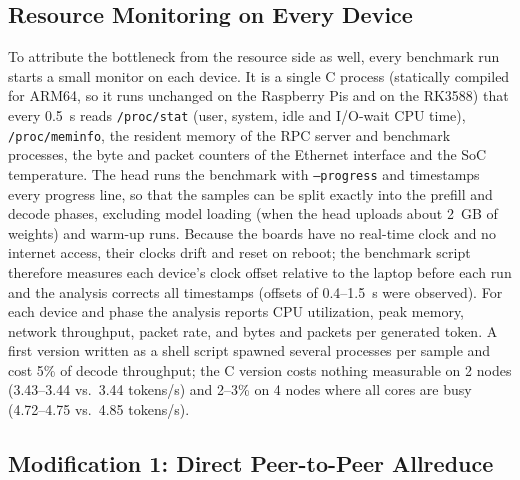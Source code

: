 \documentclass[11pt,a4paper]{article}
\begin{document}
\subsection{Resource Monitoring on Every Device}\label{sec:monitor}

To attribute the bottleneck from the resource side as well, every benchmark run starts a small monitor on each device. It is a single C process (statically compiled for ARM64, so it runs unchanged on the Raspberry Pis and on the RK3588) that every 0.5~s reads \texttt{/proc/stat} (user, system, idle and I/O-wait CPU time), \texttt{/proc/meminfo}, the resident memory of the RPC server and benchmark processes, the byte and packet counters of the Ethernet interface and the SoC temperature. The head runs the benchmark with \texttt{--progress} and timestamps every progress line, so that the samples can be split exactly into the prefill and decode phases, excluding model loading (when the head uploads about 2~GB of weights) and warm-up runs. Because the boards have no real-time clock and no internet access, their clocks drift and reset on reboot; the benchmark script therefore measures each device's clock offset relative to the laptop before each run and the analysis corrects all timestamps (offsets of 0.4--1.5~s were observed). For each device and phase the analysis reports CPU utilization, peak memory, network throughput, packet rate, and bytes and packets per generated token. A first version written as a shell script spawned several processes per sample and cost 5\% of decode throughput; the C version costs nothing measurable on 2 nodes (3.43--3.44 vs.\ 3.44 tokens/s) and 2--3\% on 4 nodes where all cores are busy (4.72--4.75 vs.\ 4.85 tokens/s).

\subsection{Modification 1: Direct Peer-to-Peer Allreduce}\label{sec:allreduce}
\end{document}
